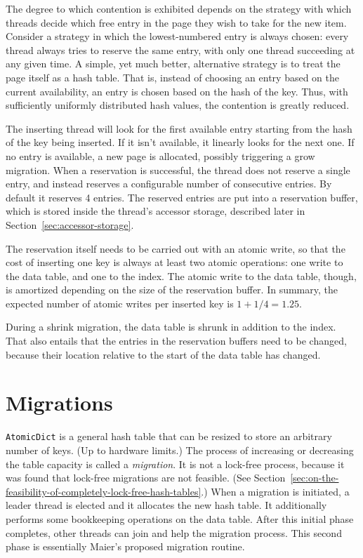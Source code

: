 The degree to which contention is exhibited depends on the strategy with which threads decide which free entry in the page they wish to take for the new item.
Consider a strategy in which the lowest-numbered entry is always chosen: every thread always tries to reserve the same entry, with only one thread succeeding at any given time.
A simple, yet much better, alternative strategy is to treat the page itself as a hash table.
That is, instead of choosing an entry based on the current availability, an entry is chosen based on the hash of the key.
Thus, with sufficiently uniformly distributed hash values, the contention is greatly reduced.

The inserting thread will look for the first available entry starting from the hash of the key being inserted.
If it isn't available, it linearly looks for the next one.
If no entry is available, a new page is allocated, possibly triggering a grow migration.
When a reservation is successful, the thread does not reserve a single entry, and instead reserves a configurable number of consecutive entries.
By default it reserves 4 entries.
The reserved entries are put into a reservation buffer, which is stored inside the thread's accessor storage, described later in Section~\ref{sec:accessor-storage}.

The reservation itself needs to be carried out with an atomic write, so that the cost of inserting one key is always at least two atomic operations: one write to the data table, and one to the index.
The atomic write to the data table, though, is amortized depending on the size of the reservation buffer.
In summary, the expected number of atomic writes per inserted key is $1 + 1/4 = 1.25$.

During a shrink migration, the data table is shrunk in addition to the index.
That also entails that the entries in the reservation buffers need to be changed, because their location relative to the start of the data table has changed.


\section{Migrations}\label{sec:migrations-design}

\texttt{AtomicDict} is a general hash table that can be resized to store an arbitrary number of keys.
(Up to hardware limits.)
The process of increasing or decreasing the table capacity is called a \emph{migration}.
It is not a lock-free process, because it was found that lock-free migrations are not feasible.
(See Section~\ref{sec:on-the-feasibility-of-completely-lock-free-hash-tables}.)
When a migration is initiated, a leader thread is elected and it allocates the new hash table.
It additionally performs some bookkeeping operations on the data table.
After this initial phase completes, other threads can join and help the migration process.
This second phase is essentially Maier's proposed migration routine.

